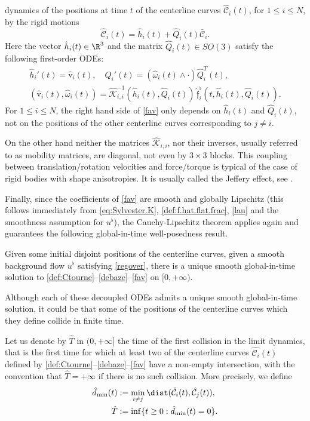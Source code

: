 dynamics of
the positions at time $t$ of the centerline curves
$\hat{{\mathcal C}}_i(t)$, for $ 1\leq i \leq N$, by the rigid motions
\begin{equation} \label{def:Ctourne}
\hat{{\mathcal C}}_i(t) = \hat h_i(t) + \hat Q_i(t) \bar {\mathcal C}_i.
\end{equation}
Here the vector ${\hat h_i(t)}\in\R^3$ and the matrix ${\hat Q_i(t)} \in SO(3)$ satisfy the following
first-order ODEs:
\begin{gather} \label{debaze}
{\hat h}_i'(t) =
\hat{\textrm{v}}_i (t),
\quad {{\hat Q}_i' (t) = ({\hat \omega}_i(t) \wedge \cdot){\hat Q}_i^{T} (t) },
\\
\label{fav} (\hat{\textrm{v}}_i(t),{\hat \omega}_i (t)) = \hat{\mathcal K}_{i,i}^{-1} (\hat h_i(t), \hat Q_i(t)) \, \hat{\mathfrak{f}}_i^\flat (t,\hat h_i(t), \hat Q_i(t)).
\end{gather}
For $ 1\leq i \leq N$, the right hand side of \eqref{fav} only depends on ${\hat h}_i(t)$ and ${\hat Q}_i (t)$, not on the positions of the other centerline curves corresponding to $j\neq i$.

On the other hand neither the matrices $\hat{\mathcal K}_{i,i}$, nor their inverses, usually referred to as mobility matrices, are diagonal, not even by $3 \times 3$ blocks. This coupling between translation/rotation velocities and force/torque is typical of the case of rigid bodies with shape anisotropies. {It} is usually called the Jeffery effect, see \cite{Jeffery,Junk-Illner,VM}.

Finally, since the coefficients of \eqref{fav} are smooth and globally Lipschitz (this follows immediately from \eqref{eq:Sylvester.K}, \eqref{def:f.hat.flat.frac}, \eqref{lau} and the smoothness assumption for $u^\flat$),
the Cauchy-Lipschitz theorem applies again and guarantees
the following global-in-time well-posedness result.
\begin{Proposition} \label{CL-limit}
Given some initial disjoint positions of the centerline curves, given a smooth background flow $u^\flat$ satisfying \eqref{regover},
there is a unique smooth global-in-time solution to \eqref{def:Ctourne}--\eqref{debaze}--\eqref{fav} on $[0,+\infty)$.
\end{Proposition}
Although each of these decoupled ODEs admits a unique smooth global-in-time solution, it could be that some of the positions of the centerline curves which they define collide in finite time.
\begin{Definition} \label{collision-limit}
Let us denote by
$\hat T $ in $(0,+\infty]$ the time of the first collision in the limit dynamics, that is the first time for which at least two of the
centerline curves $\hat{\mathcal C_i}(t)$ defined by \eqref{def:Ctourne}--\eqref{debaze}--\eqref{fav} have a non-empty intersection, with the convention that $\hat T = +\infty$ if there is no such collision. More precisely, we define
\begin{align}
\hat d_{\min}(t) &:= \min_{i \neq j} \dist(\hat {\mathcal C}_i(t), \hat {\mathcal C}_j(t)), \label{def:d.min.hat} \\
\hat T &:= \inf\{ t \geq 0 : \hat d_{\min}(t) = 0 \} \label{def:hat.T}.
\end{align}
\end{Definition}

